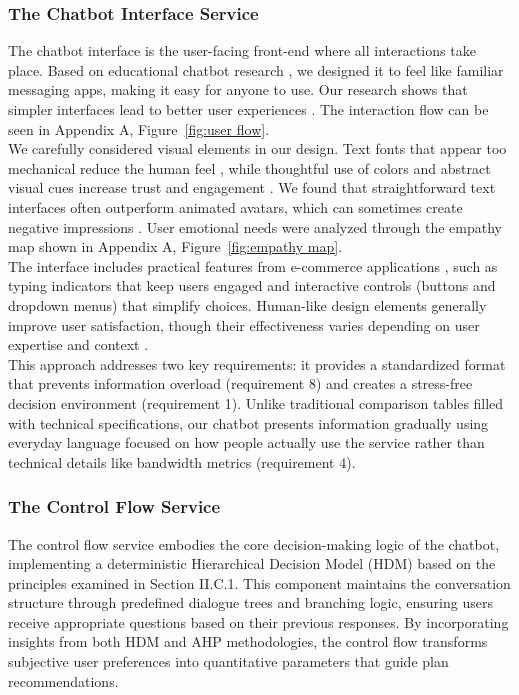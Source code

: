 \documentclass[conference]{IEEEtran}
\begin{document}
\subsubsection{The Chatbot Interface Service}
The chatbot interface is the user-facing front-end where all interactions take place. Based on educational chatbot research \cite{b7}, we designed it to feel like familiar messaging apps, making it easy for anyone to use. Our research shows that simpler interfaces lead to better user experiences \cite{b17, b12, b18}. The interaction flow can be seen in Appendix A, Figure~\ref{fig:user flow}.
\\We carefully considered visual elements in our design. Text fonts that appear too mechanical reduce the human feel \cite{b13}, while thoughtful use of colors and abstract visual cues increase trust and engagement \cite{b12, b18}. We found that straightforward text interfaces often outperform animated avatars, which can sometimes create negative impressions \cite{b15}. User emotional needs were analyzed through the empathy map shown in Appendix A, Figure~\ref{fig:empathy map}.
\\The interface includes practical features from e-commerce applications \cite{b9}, such as typing indicators that keep users engaged \cite{b16} and interactive controls (buttons and dropdown menus) that simplify choices. Human-like design elements generally improve user satisfaction, though their effectiveness varies depending on user expertise and context \cite{b14, b19}.
\\This approach addresses two key requirements: it provides a standardized format that prevents information overload (requirement 8) and creates a stress-free decision environment (requirement 1). Unlike traditional comparison tables filled with technical specifications, our chatbot presents information gradually using everyday language focused on how people actually use the service rather than technical details like bandwidth metrics (requirement 4).


\subsubsection{The Control Flow Service}
The control flow service embodies the core decision-making logic of the chatbot, implementing a deterministic Hierarchical Decision Model (HDM) based on the principles examined in Section II.C.1. This component maintains the conversation structure through predefined dialogue trees and branching logic, ensuring users receive appropriate questions based on their previous responses. By incorporating insights from both HDM \cite{b4} and AHP \cite{b5} methodologies, the control flow transforms subjective user preferences into quantitative parameters that guide plan recommendations.
\end{document}
